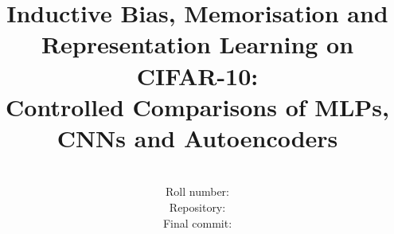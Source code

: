 \documentclass[10pt,twocolumn,letterpaper]{article}
\title{Inductive Bias, Memorisation and Representation Learning on CIFAR-10:\\
Controlled Comparisons of MLPs, CNNs and Autoencoders}
\author{\StudentName\\
Roll number: \StudentRoll\\
{\small Repository: \RepoURL}\\
{\small Final commit: \texttt{\CommitHash}}
}
\begin{document}
\maketitle






{
    \small
    
    
}
\end{document}
